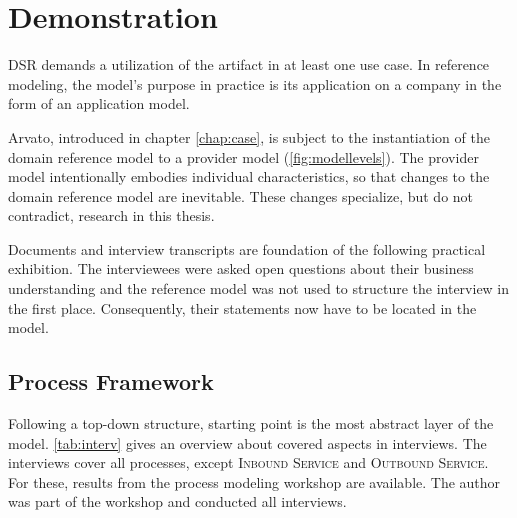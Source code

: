 
\chapter{Demonstration}
\label{chap:demo}

\acrshort{DSR} demands a utilization of the artifact in at least one use case. In reference modeling, the model's purpose in practice is its application on a company in the form of an application model. 

Arvato, introduced in chapter \ref{chap:case}, is subject to the instantiation of the domain reference model to a provider model (\cf \Fig \ref{fig:modellevels}). The provider model intentionally embodies individual characteristics, so that changes to the domain reference model are inevitable. These changes specialize, but do not contradict, research in this thesis. 

Documents and interview transcripts are foundation of the following practical exhibition. The interviewees were asked open questions about their business understanding and the reference model was not used to structure the interview in the first place. Consequently, their statements now have to be located in the model. 

	\section{Process Framework}
	
	Following a top-down structure, starting point is the most abstract layer of the model.
	 \Tab \ref{tab:interv} gives an overview about covered aspects in interviews. The interviews cover all processes, except \textsc{Inbound Service} and \textsc{Outbound Service}. For these, results from the process modeling workshop are available. The author was part of the workshop and conducted all interviews. 

